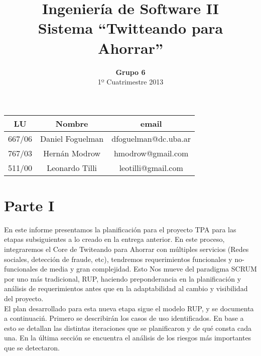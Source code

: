 \documentclass[a4paper]{article}
\title{Ingeniería de Software II\\ \textbf{Sistema ``Twitteando para Ahorrar''}}
\author{\textbf{Grupo 6}\\ 1º Cuatrimestre 2013}
\date{}
\begin{document}
\maketitle
\vspace{10cm}
\begin{center}

\begin{tabular}{|c|c|c|}
\hline
\hline
\textbf{LU}&\textbf{Nombre}&\textbf{email}\\
\hline
667/06&Daniel Foguelman &dfoguelman@dc.uba.ar\\
\hline
767/03&Hernán Modrow&hmodrow@gmail.com\\
\hline
511/00&Leonardo Tilli&leotilli@gmail.com\\
\hline
\hline
\end{tabular}
\end{center}
\newpage

\section{Parte I}

 En este informe presentamos la planificación para el proyecto TPA para las etapas subsiguientes a lo creado en la entrega anterior. En este proceso, integraremos el Core de Twiteando para Ahorrar con múltiples servicios (Redes sociales, detección de fraude, etc), tendremos requerimientos funcionales y no-funcionales de media y gran complejidad. Esto Nos mueve del paradigma SCRUM por uno más tradicional, RUP, haciendo preponderancia en la planificación y análisis de requerimientos antes que en la adaptabilidad al cambio y visibilidad del proyecto. \\

 El plan desarrollado para esta nueva etapa sigue el modelo RUP, y se documenta a continuaci\'n. Primero se describir\'an los casos de uso identificados. En base a esto se detallan las distintas iteraciones que se planificaron y de qu\'e consta cada una. En la \'ultima secci\'on se encuentra el an\'alisis de los riesgos m\'as importantes que se detectaron.





\end{document}

